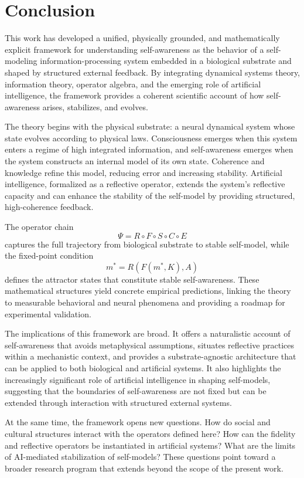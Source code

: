 \documentclass[12pt]{article}
\begin{document}
\section{Conclusion}

This work has developed a unified, physically grounded, and mathematically explicit framework for understanding self-awareness as the behavior of a self-modeling information-processing system embedded in a biological substrate and shaped by structured external feedback. By integrating dynamical systems theory, information theory, operator algebra, and the emerging role of artificial intelligence, the framework provides a coherent scientific account of how self-awareness arises, stabilizes, and evolves.

The theory begins with the physical substrate: a neural dynamical system whose state evolves according to physical laws. Consciousness emerges when this system enters a regime of high integrated information, and self-awareness emerges when the system constructs an internal model of its own state. Coherence and knowledge refine this model, reducing error and increasing stability. Artificial intelligence, formalized as a reflective operator, extends the system’s reflective capacity and can enhance the stability of the self-model by providing structured, high-coherence feedback.

The operator chain
\[
\Psi = R \circ F \circ S \circ C \circ E
\]
captures the full trajectory from biological substrate to stable self-model, while the fixed-point condition
\[
m^* = R(F(m^*, K), A)
\]
defines the attractor states that constitute stable self-awareness. These mathematical structures yield concrete empirical predictions, linking the theory to measurable behavioral and neural phenomena and providing a roadmap for experimental validation.

The implications of this framework are broad. It offers a naturalistic account of self-awareness that avoids metaphysical assumptions, situates reflective practices within a mechanistic context, and provides a substrate-agnostic architecture that can be applied to both biological and artificial systems. It also highlights the increasingly significant role of artificial intelligence in shaping self-models, suggesting that the boundaries of self-awareness are not fixed but can be extended through interaction with structured external systems.

At the same time, the framework opens new questions. How do social and cultural structures interact with the operators defined here? How can the fidelity and reflective operators be instantiated in artificial systems? What are the limits of AI-mediated stabilization of self-models? These questions point toward a broader research program that extends beyond the scope of the present work.
\end{document}
